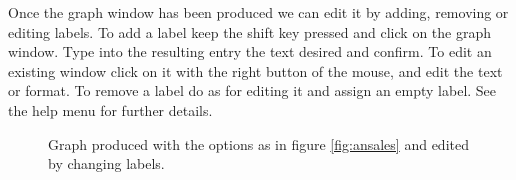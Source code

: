 \documentclass [11pt,a4paper] {book}
\begin{document}
Once the graph window has been produced we can edit it by adding, removing or editing labels. To add a label keep the shift key pressed and click on the graph window. Type into the resulting entry the text desired and confirm. To edit an existing window click on it with the right button of the mouse, and edit the text or format. To remove a label do as for editing it and assign an empty label. See the help menu for further details.


\begin{figure}[ht]
  \centering
  \caption{\small Graph produced with the options as in figure \ref{fig:ansales} and edited by changing labels.}
   \label{fig:randomwalk}
\end{figure}
\end{document}
